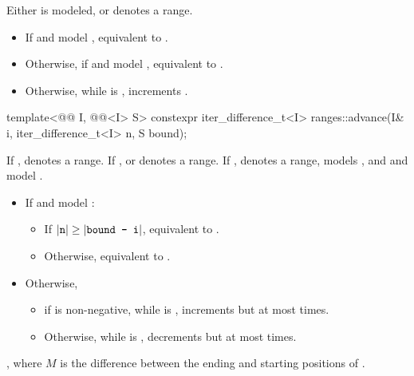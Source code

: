 \begin{itemdescr}
\pnum
\expects
Either  is modeled, or
 denotes a range.

\pnum
\effects
\begin{itemize}
\item If  and  model ,
  equivalent to .
\item Otherwise, if  and  model ,
  equivalent to .
\item Otherwise, while  is ,
  increments .
\end{itemize}
\end{itemdescr}

%
\begin{itemdecl}
template<@@ I, @@<I> S>
  constexpr iter_difference_t<I> ranges::advance(I& i, iter_difference_t<I> n, S bound);
\end{itemdecl}

\begin{itemdescr}
\pnum
\expects
If ,  denotes a range.
If ,  or  denotes a range.
If ,  denotes a range,
 models , and
 and  model .

\pnum
\effects
\begin{itemize}
\item If  and  model :
  \begin{itemize}
  \item If \brk{}$|\tcode{n}| \ge |\tcode{bound - i}|$,
    equivalent to .
  \item Otherwise, equivalent to .
  \end{itemize}
\item Otherwise,
  \begin{itemize}
  \item if  is non-negative,
    while  is ,
    increments  but at most  times.
  \item Otherwise,
    while  is ,
    decrements  but at most  times.
  \end{itemize}
\end{itemize}

\pnum
\returns
{}, where $M$ is the difference between
the ending and starting positions of .
\end{itemdescr}


